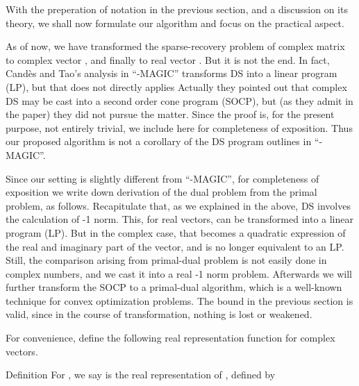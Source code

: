 \startchapter [title={Simulation}]

With the preperation of notation in the previous section, and a discussion on its theory, we shall now formulate our algorithm and focus on the practical aspect.

As of now, we have transformed the sparse-recovery problem of complex matrix  to complex vector , and finally to real vector .
But it is not the end.
In fact, Cand\`es and Tao's analysis in ``-MAGIC'' transforms DS into a linear program (LP), but that does not directly applies
Actually they pointed out that complex DS may be cast into a second order cone program (SOCP), but (as they admit in the paper) they did not pursue the matter.
Since the proof is, for the present purpose, not entirely trivial, we include here for completeness of exposition.
Thus our proposed algorithm is not a corollary of the DS program outlines in ``-MAGIC''.

\startsection [title={Transformation into Second Order Cone Problem}]

Since our setting is slightly different from ``-MAGIC'', for completeness of exposition we write down derivation of the dual problem from the primal problem, as follows.
Recapitulate that, as we explained in the above, DS involves the calculation of -1 norm.
This, for real vectors, can be transformed into a linear program (LP).
But in the complex case, that becomes a quadratic expression of the real and imaginary part of the vector, and is no longer equivalent to an LP.
Still, the comparison arising from primal-dual problem is not easily done in complex numbers, and we cast it into a real -1 norm problem.
Afterwards we will further transform the SOCP to a primal-dual algorithm, which is a well-known technique for convex optimization problems.
The bound in the previous section is valid, since in the course of transformation, nothing is lost or weakened.

For convenience, define the following real representation function for complex vectors.

\Result
{Definition}
{
For , we say  is the real representation of , defined by
%
%
}


